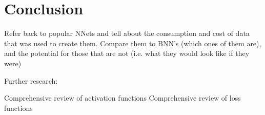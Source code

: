 \chapter{Conclusion}

Refer back to popular NNets and tell about the consumption and cost of data that was used to create them.  Compare them to BNN's (which ones of them are), and the potential for those that are not (i.e. what they would look like if they were)

Further research:

Comprehensive review of activation functions
Comprehensive review of loss functions